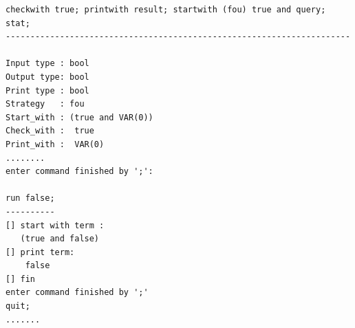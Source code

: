 \documentclass{article}
\begin{document}
\begin{itemize}
{\begin{verbatim}
checkwith true; printwith result; startwith (fou) true and query; stat;
----------------------------------------------------------------------

Input type : bool
Output type: bool
Print type : bool
Strategy   : fou
Start_with : (true and VAR(0))
Check_with :  true
Print_with :  VAR(0)
........
enter command finished by ';':

run false;
----------
[] start with term :
   (true and false)
[] print term:
    false
[] fin
enter command finished by ';'
quit;
.......
\end{verbatim}}
\end{itemize}



  
\end{document}
